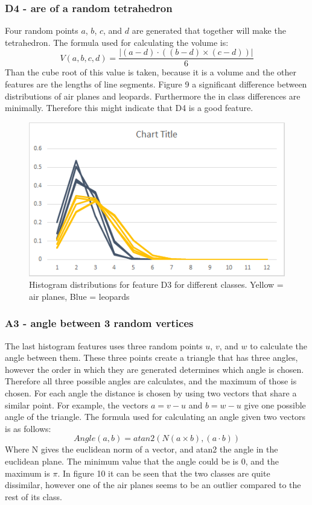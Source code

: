 \documentclass{bigdata}
\begin{document}
\subsubsection{D4 - are of a random tetrahedron}
Four random points $a$, $b$, $c$, and $d$ are generated that together will make the tetrahedron. The formula used for calculating the volume is:
\begin{equation}
V(a,b,c,d) = \frac{|(a - d) \cdot ((b - d) \times (c - d))|}{6}
\end{equation}
Than the cube root of this value is taken, because it is a volume and the other features are the lengths of line segments. Figure 9 a significant difference between distributions of air planes and leopards. Furthermore the in class differences are minimally. Therefore this might indicate that D4 is a good feature. 
\begin{figure}[h!]
    \includegraphics[width=\linewidth]{Pictures/Part3/D4.png}
    \caption{Histogram distributions for feature D3 for different classes. Yellow = air planes, Blue = leopards}
  \label{fig:eccentricity}
\end{figure}

\subsubsection{A3 - angle between 3 random vertices}
The last histogram features uses three random points $u$, $v$, and $w$ to calculate the angle between them. These three points create a triangle that has three angles, however the order in which they are generated determines which angle is chosen. Therefore all three possible angles are calculates, and the maximum of those is chosen. For each angle the distance is chosen by using two vectors that share a similar point. For example, the vectors $a = v-u$ and $b = w-u$ give one possible angle of the triangle. The formula used for calculating an angle given two vectors is as follows:
\begin{equation}
Angle(a,b) = atan2(N(a \times b), (a \cdot b))
\end{equation}
Where N gives the euclidean norm of a vector, and atan2 the angle in the euclidean plane. The minimum value that the angle could be is 0, and the maximum is $\pi$.
In figure 10 it can be seen that the two classes are quite dissimilar, however one of the air planes seems to be an outlier compared to the rest of its class.
\end{document}
